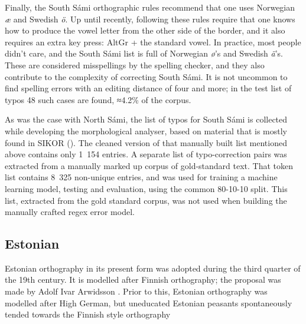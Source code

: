 \documentclass{flammie}
\begin{document}
Finally, the South Sámi orthographic rules recommend that one uses Norwegian
\textit{æ} and Swedish \textit{ö}. Up until recently, following these rules
require that one knows how to produce the vowel letter from the other side of
the border, and it also requires an extra key press: AltGr + the standard vowel.
In practice, most people didn't care, and the South Sámi list is full of
Norwegian \textit{ø}'s and Swedish \textit{ä}'s. These are considered
misspellings by the spelling checker, and they also contribute to the complexity
of correcting South Sámi. It is not uncommon to find spelling errors with an
editing distance of four and more; in the test list of typos 48 such cases are
found, ≈4.2\% of the corpus.

As was the case with North Sámi, the list of typos for South Sámi is collected
while developing the morphological analyser, based on material that is mostly
found in SIKOR (\cite{sikor_06.11.2018}). The cleaned version of that manually
built list mentioned above contains only 1~154 entries. A separate list of
typo-correction pairs was extracted from a manually marked up corpus of
gold-standard text. That token list contains 8~325 non-unique entries, and was
used for training a machine learning model, testing and evaluation, using the
common 80-10-10 split. This list, extracted from the gold standard corpus, was
not used when building the manually crafted regex error model.

\subsection{Estonian}

Estonian orthography in its present form was adopted during the third quarter of
the 19th century. It is modelled after Finnish orthography; the proposal was
made by Adolf Ivar Arwidsson \cite{Arwidsson1822}. Prior to this,
Estonian orthography was modelled after High German, but uneducated Estonian
peasants spontaneously tended towards the Finnish style orthography \cite[p.
204]{Kask1970}
\end{document}
